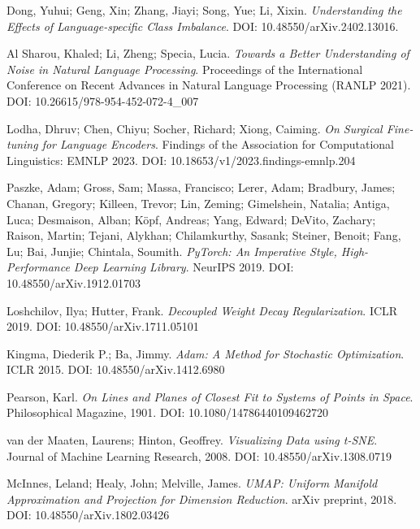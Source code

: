 \documentclass[12pt]{article}
\begin{document}
\begin{thebibliography}{9}
Dong, Yuhui; Geng, Xin; Zhang, Jiayi; Song, Yue; Li, Xixin.
\textit{Understanding the Effects of Language-specific Class Imbalance}.
DOI: 10.48550/arXiv.2402.13016.

Al Sharou, Khaled; Li, Zheng; Specia, Lucia.
\textit{Towards a Better Understanding of Noise in Natural Language Processing}.
Proceedings of the International Conference on Recent Advances in Natural Language Processing (RANLP 2021).
DOI: 10.26615/978-954-452-072-4\_007

Lodha, Dhruv; Chen, Chiyu; Socher, Richard; Xiong, Caiming.
\textit{On Surgical Fine-tuning for Language Encoders}.
Findings of the Association for Computational Linguistics: EMNLP 2023.
DOI: 10.18653/v1/2023.findings-emnlp.204

Paszke, Adam; Gross, Sam; Massa, Francisco; Lerer, Adam; Bradbury, James; Chanan, Gregory; Killeen, Trevor; Lin, Zeming; Gimelshein, Natalia; Antiga, Luca; Desmaison, Alban; Köpf, Andreas; Yang, Edward; DeVito, Zachary; Raison, Martin; Tejani, Alykhan; Chilamkurthy, Sasank; Steiner, Benoit; Fang, Lu; Bai, Junjie; Chintala, Soumith.
\textit{PyTorch: An Imperative Style, High-Performance Deep Learning Library}.
NeurIPS 2019.
DOI: 10.48550/arXiv.1912.01703

Loshchilov, Ilya; Hutter, Frank.
\textit{Decoupled Weight Decay Regularization}.
ICLR 2019.
DOI: 10.48550/arXiv.1711.05101

Kingma, Diederik P.; Ba, Jimmy.
\textit{Adam: A Method for Stochastic Optimization}.
ICLR 2015.
DOI: 10.48550/arXiv.1412.6980

Pearson, Karl.
\textit{On Lines and Planes of Closest Fit to Systems of Points in Space}.
Philosophical Magazine, 1901.
DOI: 10.1080/14786440109462720

van der Maaten, Laurens; Hinton, Geoffrey.
\textit{Visualizing Data using t-SNE}.
Journal of Machine Learning Research, 2008.
DOI: 10.48550/arXiv.1308.0719

McInnes, Leland; Healy, John; Melville, James.
\textit{UMAP: Uniform Manifold Approximation and Projection for Dimension Reduction}.
arXiv preprint, 2018.
DOI: 10.48550/arXiv.1802.03426


\end{thebibliography}


\appendix
\end{document}
